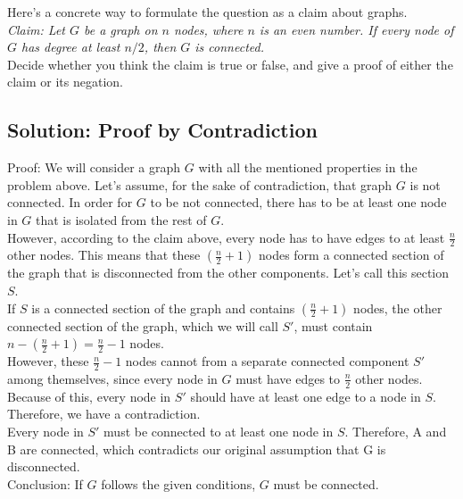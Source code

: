 \documentclass[letter,11pt]{article}
\begin{document}
Here's a concrete way to formulate the question as a claim about
graphs.\\

\emph{Claim: Let $G$ be a graph on $n$ nodes, where $n$ is an even number. If every node
of $G$ has degree at least $n/2$, then $G$ is connected.}\\

Decide whether you think the claim is true or false, and give a proof of
either the claim or its negation.

\subsection{Solution: Proof by Contradiction}

Proof: We will consider a graph $G$ with all the mentioned properties in the problem above. Let's assume, for the sake of contradiction, that graph $G$ is not connected. In order for $G$ to be not connected, there has to be at least one node in $G$ that is isolated from the rest of $G$. \\

However, according to the claim above, every node has to have edges to at least $\frac{n}{2}$ other nodes. This means that these $(\frac{n}{2} + 1)$ nodes form a connected section of the graph that is disconnected from the other components. Let's call this section $S$. \\

If $S$ is a connected section of the graph and contains $(\frac{n}{2} + 1)$ nodes, the other connected section of the graph, which we will call $S'$, must contain $n - (\frac{n}{2} + 1) = \frac{n}{2} - 1$ nodes. \\

However, these $\frac{n}{2} - 1$ nodes cannot from a separate connected component $S'$ among themselves, since every node in $G$ must have edges to $\frac{n}{2}$ other nodes. Because of this, every node in $S'$ should have at least one edge to a node in $S$. Therefore, we have a contradiction. \\

Every node in $S'$ must be connected to at least one node in $S$. Therefore, A and B are connected, which contradicts our original assumption that G is disconnected. \\

Conclusion: If $G$ follows the given conditions, $G$ must be connected. \\
\end{document}
